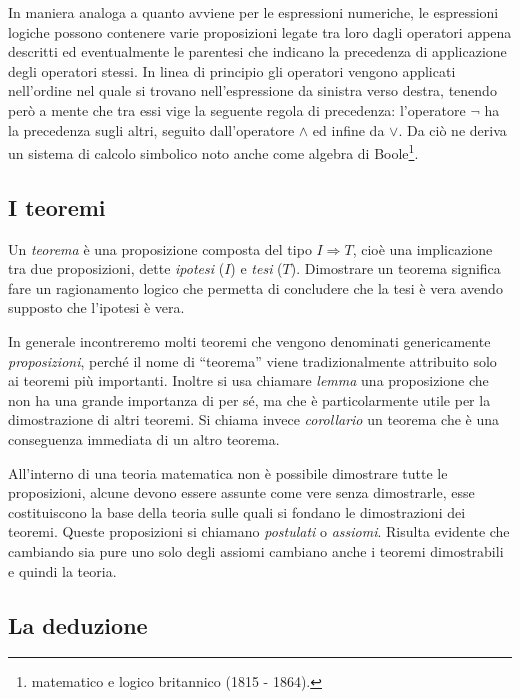 In maniera analoga a quanto avviene per le espressioni numeriche, le espressioni logiche possono contenere varie proposizioni legate tra loro dagli operatori appena descritti ed eventualmente le parentesi che indicano la precedenza di applicazione degli operatori stessi. In linea di principio gli operatori vengono applicati nell'ordine nel quale si trovano nell'espressione da sinistra verso destra, tenendo però a mente che tra essi vige la seguente regola di precedenza: l'operatore $\neg$ ha la precedenza sugli altri, seguito dall'operatore $\wedge$ ed infine da $\vee$. Da ciò ne deriva un sistema di calcolo simbolico noto anche come algebra di Boole\footnote{matematico e logico britannico (1815 - 1864).}.

\vspazio\ovalbox{\risolvii \ref{ese:\thechapter.12}, \ref{ese:\thechapter.13}, \ref{ese:\thechapter.14}, \ref{ese:\thechapter.15}}

\subsection{I teoremi}

Un \emph{teorema} è una proposizione composta del tipo $I\Rightarrow T$, cioè una implicazione tra due proposizioni, dette \emph{ipotesi} ($I$) e \emph{tesi} ($T$). Dimostrare un teorema significa fare un ragionamento logico che permetta di concludere che la tesi è vera avendo supposto che l'ipotesi è vera.

In generale incontreremo molti teoremi che vengono denominati genericamente \emph{proposizioni}, perché il nome di ``teorema'' viene tradizionalmente attribuito solo ai teoremi più importanti. Inoltre si usa chiamare \emph{lemma} una proposizione che non ha una grande importanza di per sé, ma che è particolarmente utile per la dimostrazione di altri teoremi. Si chiama invece \emph{corollario} un teorema che è una conseguenza immediata di un altro teorema.

All'interno di una teoria matematica non è possibile dimostrare tutte le proposizioni, alcune devono essere assunte come vere senza dimostrarle, esse costituiscono la base della teoria sulle quali si fondano le dimostrazioni dei teoremi. Queste proposizioni si chiamano \emph{postulati} o \emph{assiomi}. Risulta evidente che cambiando sia pure uno solo degli assiomi cambiano anche i teoremi dimostrabili e quindi la teoria.


\subsection{La deduzione}

